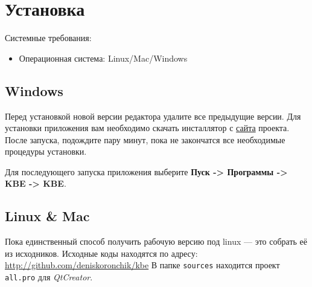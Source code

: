 \newpage
\section{Установка}

Системные требования:
\begin{itemize}
	\item Операционная система: Linux/Mac/Windows
\end{itemize}

\subsection{Windows}

Перед установкой новой версии редактора удалите все пре\-дыдущие версии.
Для установки приложения вам необходимо скачать инсталлятор с \href{http://sourceforge.net/projects/ostis/}{сайта} проекта.
После запуска, подождите пару минут, пока не закончатся все необходимые процедуры установки.

Для последующего запуска приложения выберите \textbf{Пуск -> Программы -> KBE -> KBE}.

\subsection{Linux \& Mac}

Пока единственный способ получить рабочую версию под linux — это собрать её из исходников. Исходные коды находятся по адресу: \href{http://github.com/deniskoronchik/kbe}{http://github.com/deniskoronchik/kbe}
В папке {\tt sources} находится проект {\tt all.pro} для \textit{QtCreator}.

